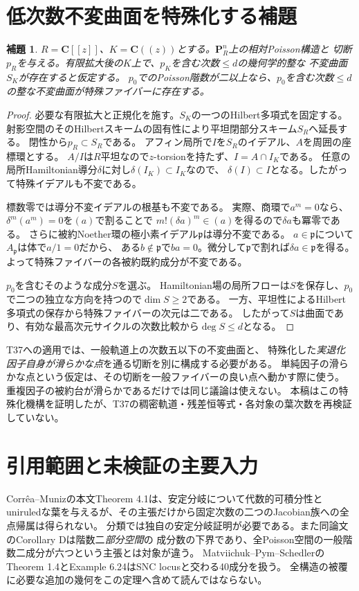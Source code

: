 \documentclass[a4paper,11pt]{ltjsarticle}
\newtheorem{lemma}[proposition]{補題}
\theoremstyle{remark}\newtheorem{remark}[proposition]{注意}
\newcommand{\PP}{\mathbf P}
\newcommand{\CC}{\mathbf C}
\begin{document}
\section{低次数不変曲面を特殊化する補題}
\begin{lemma}\label{lem:specialize}
$R=\CC[[z]]$、$K=\CC((z))$とする。$\PP^n_R$上の相対Poisson構造と
切断$p_R$を与える。有限拡大後の$K$上で、$p_K$を含む次数$\le d$の幾何学的整な
不変曲面$S_K$が存在すると仮定する。
$p_0$でのPoisson階数が二以上なら、$p_0$を含む次数$\le d$の整な不変曲面が特殊ファイバーに存在する。
\end{lemma}
\begin{proof}
必要な有限拡大と正規化を施す。$S_K$の一つのHilbert多項式を固定する。
射影空間のそのHilbertスキームの固有性により平坦閉部分スキーム$S_R$へ延長する。
閉性から$p_R\subset S_R$である。
アフィン局所で$I$を$S_R$のイデアル、$A$を周囲の座標環とする。
$A/I$は$R$平坦なので$z$-torsionを持たず、$I=A\cap I_K$である。
任意の局所Hamiltonian導分$\delta$に対し$\delta(I_K)\subset I_K$なので、
$\delta(I)\subset I$となる。したがって特殊イデアルも不変である。

標数零では導分不変イデアルの根基も不変である。
実際、商環で$a^m=0$なら、$\delta^m(a^m)=0$を$(a)$で割ることで
$m!(\delta a)^m\in(a)$を得るので$\delta a$も冪零である。
さらに被約Noether環の極小素イデアル$\mathfrak p$は導分不変である。
$a\in\mathfrak p$について$A_{\mathfrak p}$は体で$a/1=0$だから、
ある$b\notin\mathfrak p$で$ba=0$。微分して$\mathfrak p$で割れば$\delta a\in\mathfrak p$を得る。
よって特殊ファイバーの各被約既約成分が不変である。

$p_0$を含むそのような成分$S$を選ぶ。
Hamiltonian場の局所フローは$S$を保存し、$p_0$で二つの独立な方向を持つので$\dim S\ge2$である。
一方、平坦性によるHilbert多項式の保存から特殊ファイバーの次元は二である。
したがって$S$は曲面であり、有効な最高次元サイクルの次数比較から$\deg S\le d$となる。
\end{proof}

T37への適用では、一般軌道上の次数五以下の不変曲面と、
特殊化した\emph{実退化因子自身が滑らかな点}を通る切断を別に構成する必要がある。
単純因子の滑らかな点という仮定は、その切断を一般ファイバーの良い点へ動かす際に使う。
重複因子の被約台が滑らかであるだけでは同じ議論は使えない。
本稿はこの特殊化機構を証明したが、T37の稠密軌道・残差恒等式・各対象の葉次数を再検証していない。

\section{引用範囲と未検証の主要入力}
Corr\^ea--Munizの本文Theorem 4.1\cite{CM}は、安定分岐について代数的可積分性と
uniruledな葉を与えるが、その主張だけから固定次数の二つのJacobian族への全点帰属は得られない。
分類では独自の安定分岐証明が必要である。また同論文のCorollary Dは階数二\emph{部分空間}の
成分数の下界であり、全Poisson空間の一般階数二成分が六つという主張とは対象が違う。
Matviichuk--Pym--SchedlerのTheorem 1.4とExample 6.24\cite{MPS}はSNC locusと交わる40成分を扱う。
全構造の被覆に必要な追加の幾何をこの定理へ含めて読んではならない。
\end{document}
